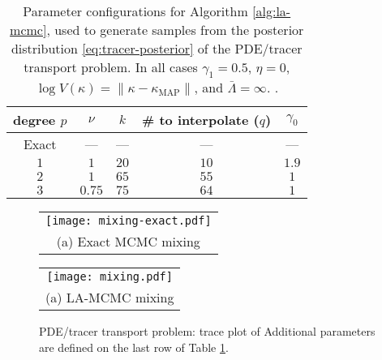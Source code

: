 \begin{table}[h!]
    \centering
    \begin{tabular}{c|c|c|c|c}
        degree $p$ & $\nu$ & $k$ & \# to interpolate ($q$) & $\gamma_0$ \\ \hline \hline
        Exact & --- & --- & --- & ---\\
        $1$ & $1$ & $20$ & $10$ & $1.9$ \\
        $2$ & $1$ & $65$ & $55$ & $1$ \\
        $3$ & $0.75$ & $75$ & $64$ & $1$ 
    \end{tabular}
    \caption{Parameter configurations for Algorithm \ref{alg:la-mcmc}, used to generate samples from the posterior distribution \eqref{eq:tracer-posterior} of the PDE/tracer transport problem. In all cases $\gamma_1 = 0.5$, $\eta = 0$, $\log{V(\kappa)} = \|\kappa-\kappa_{\text{MAP}}\|$, and $\bar{\Lambda} = \infty$. .}
    \label{tab:tracer-mcmc-parameters}
\end{table}

\begin{figure}
  \centering
  
  \begin{tabular}{@{}c@{}}
    \texttt{[image: mixing-exact.pdf]} \\[\abovecaptionskip]
    \small (a) Exact MCMC mixing
  \end{tabular}
  
  \begin{tabular}{@{}c@{}}
    \texttt{[image: mixing.pdf]} \\[\abovecaptionskip]
    \small (a) LA-MCMC mixing
  \end{tabular}
  
  \caption{PDE/tracer transport problem: trace plot of  Additional parameters are defined on the last row of Table \ref{tab:tracer-mcmc-parameters}.}
  \label{fig:tracer-mixing}
\end{figure}

